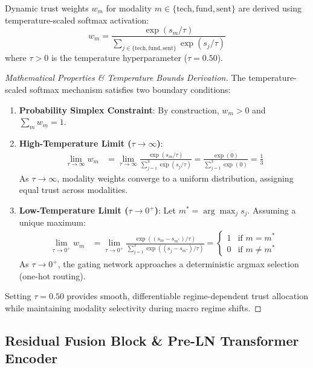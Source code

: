 Dynamic trust weights $w_m$ for modality $m \in \{\text{tech}, \text{fund}, \text{sent}\}$ are derived using temperature-scaled softmax activation:
\begin{equation}
w_m = \frac{\exp(s_m / \tau)}{\sum_{j \in \{\text{tech}, \text{fund}, \text{sent}\}} \exp(s_j / \tau)}
\label{eq:ch4_temperature_softmax}
\end{equation}
where $\tau > 0$ is the temperature hyperparameter ($\tau = 0.50$).

\begin{proof}[Mathematical Properties \& Temperature Bounds Derivation]
The temperature-scaled softmax mechanism satisfies two boundary conditions:
\begin{enumerate}
    \item \textbf{Probability Simplex Constraint}: By construction, $w_m > 0$ and $\sum_{m} w_m = 1$.
    \item \textbf{High-Temperature Limit ($\tau \to \infty$)}:
    \begin{align}
    \lim_{\tau \to \infty} w_m &= \lim_{\tau \to \infty} \frac{\exp(s_m / \tau)}{\sum_{j=1}^3 \exp(s_j / \tau)} = \frac{\exp(0)}{\sum_{j=1}^3 \exp(0)} = \frac{1}{3}
    \end{align}
    As $\tau \to \infty$, modality weights converge to a uniform distribution, assigning equal trust across modalities.
    \item \textbf{Low-Temperature Limit ($\tau \to 0^+$)}: Let $m^* = \arg\max_{j} s_j$. Assuming a unique maximum:
    \begin{align}
    \lim_{\tau \to 0^+} w_m &= \lim_{\tau \to 0^+} \frac{\exp((s_m - s_{m^*}) / \tau)}{\sum_{j=1}^3 \exp((s_j - s_{m^*}) / \tau)} = \begin{cases} 
    1 & \text{if } m = m^* \\
    0 & \text{if } m \neq m^*
    \end{cases}
    \end{align}
    As $\tau \to 0^+$, the gating network approaches a deterministic argmax selection (one-hot routing).
\end{enumerate}
Setting $\tau = 0.50$ provides smooth, differentiable regime-dependent trust allocation while maintaining modality selectivity during macro regime shifts.
\end{proof}

\subsection{Residual Fusion Block \& Pre-LN Transformer Encoder}
\label{subsec:ch4_fusion_transformer}

